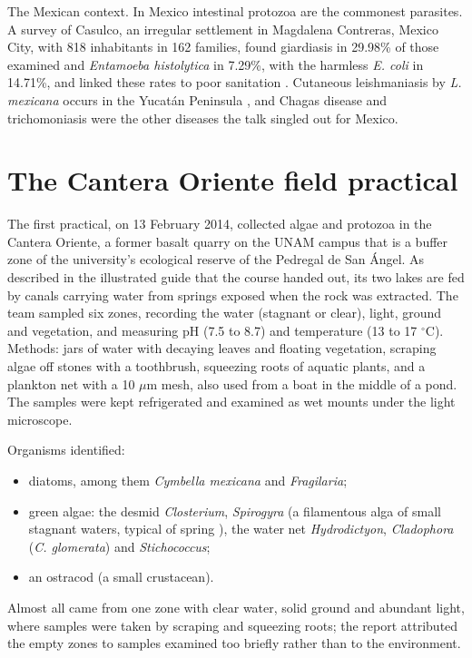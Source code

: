 The Mexican context. In Mexico intestinal
protozoa are the commonest parasites. A
survey of Casulco, an irregular settlement in
Magdalena Contreras, Mexico City, with 818
inhabitants in 162 families, found giardiasis
in 29.98\% of those examined and
\emph{Entamoeba histolytica} in 7.29\%, with
the harmless \emph{E. coli} in 14.71\%, and
linked these rates to poor sanitation
\cite{sanchezvega2000frecuencia}. Cutaneous
leishmaniasis by \emph{L. mexicana} occurs in
the Yucat\'an Peninsula \cite[Chapter
39]{willey2008prescott}, and Chagas disease
and trichomoniasis were the other diseases
the talk singled out for Mexico.

\section{The Cantera Oriente field practical}
\label{section-cantera-oriente}

The first practical, on 13 February 2014,
collected algae and protozoa in the Cantera
Oriente, a former basalt quarry on the UNAM
campus that is a buffer zone of the
university's ecological reserve of the
Pedregal de San \'Angel. As described in the
illustrated guide that the course handed out,
its two lakes are fed by canals carrying
water from springs exposed when the rock was
extracted. The team sampled six zones,
recording the water (stagnant or clear),
light, ground and vegetation, and measuring
pH (7.5 to 8.7) and temperature (13 to 17
$^\circ$C). Methods: jars of water with
decaying leaves and floating vegetation,
scraping algae off stones with a toothbrush,
squeezing roots of aquatic plants, and a
plankton net with a 10 $\mu$m mesh, also used
from a boat in the middle of a pond. The
samples were kept refrigerated and examined
as wet mounts under the light microscope.

Organisms identified:
\begin{itemize}
\item diatoms, among them \emph{Cymbella
mexicana} and \emph{Fragilaria};
\item green algae: the desmid
\emph{Closterium}, \emph{Spirogyra} (a
filamentous alga of small stagnant waters,
typical of spring \cite[Chapter
5]{lee2008phycology}), the water net
\emph{Hydrodictyon}, \emph{Cladophora}
(\emph{C. glomerata}) and
\emph{Stichococcus};
\item an ostracod (a small crustacean).
\end{itemize}
Almost all came from one zone with clear
water, solid ground and abundant light, where
samples were taken by scraping and squeezing
roots; the report attributed the empty zones
to samples examined too briefly rather than
to the environment.





